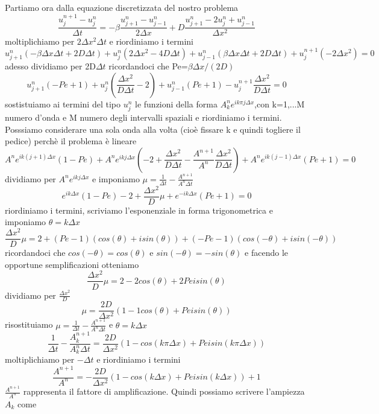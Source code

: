 \documentclass[]{article}
\begin{document}
\subsection{}
Partiamo ora dalla equazione discretizzata del nostro problema
$$\frac{u^{n+1}_j-u^{n}_j}{\Delta t}=-\beta \frac{u^{n}_{j+1}-u^{n}_{j-1}}{2\Delta x}+D\frac{u^{n}_{j+1}-2u^{n}_{j}+u^{n}_{j-1}}{\Delta x^{2}}$$\newline
moltiplichiamo per $2\Delta x^{2}\Delta t$ e riordiniamo i termini
$$u^{n}_{j+1}(-\beta \Delta x\Delta t+2D\Delta t )+u^{n}_{j}(2\Delta x^{2}-4D\Delta t)+u^{n}_{j-1}(\beta\Delta x\Delta t+2D\Delta t )+u^{n+1}_{j}(-2\Delta x^{2})=0$$
adesso dividiamo per 2D$\Delta t$ ricordandoci che Pe=$\beta\Delta x/(2D)$
$$u^{n}_{j+1}(-Pe+1)+u^{n}_{j}(\frac{\Delta x^{2}}{D\Delta t}-2)+u^{n}_{j-1}(Pe+1)-u^{n+1}_{j}\frac{\Delta x^{2}}{D\Delta t}=0$$
sostistuiamo ai termini del tipo $u^{n}_{j}$ le funzioni della forma $A^{n}_k e^{ik\pi j\Delta x}$,con k=1,...M numero d'onda e M numero degli intervalli spaziali e riordiniamo i termini. Posssiamo considerare una sola onda alla volta (cioè fissare k e quindi togliere il pedice) perchè il problema è lineare
$$A^{n} e^{ik (j+1)\Delta x}(1-Pe)+A^{n} e^{ik j\Delta x}(-2+\frac{\Delta x^{2}}{D\Delta t}-\frac{A^{n+1}}{A^{n}}\frac{\Delta x^{2}}{D\Delta t})+A^{n} e^{ik (j-1)\Delta x}(Pe+1)=0$$
dividiamo per $A^{n} e^{ik j\Delta x}$ e imponiamo $\mu =\frac{1}{\Delta t}-\frac{A^{n+1}}{A^{n} \Delta t}$
$$ e^{ik\Delta x}(1-Pe)-2+\frac{\Delta x^{2}}{D}\mu+ e^{-ik \Delta x}(Pe+1)=0$$
riordiniamo i termini, scriviamo l'esponenziale in forma trigonometrica e imponiamo $\theta=k\Delta x$
$$\frac{\Delta x^{2}}{D}\mu=2+(Pe-1)(cos(\theta)+isin(\theta))+(-Pe-1)(cos(-\theta)+isin(-\theta))$$
ricordandoci che $cos(-\theta)=cos(\theta)$ e $sin(-\theta)=-sin(\theta)$ e facendo le opportune semplificazioni otteniamo
$$\frac{\Delta x^{2}}{D}\mu=2-2cos(\theta)+2Pe i sin(\theta)$$
dividiamo per  $\frac{\Delta x^{2}}{D}$
$$\mu=\frac{2D}{\Delta x^{2}}(1-1cos(\theta)+Pe i sin(\theta))$$
risostituiamo $\mu =\frac{1}{\Delta t}-\frac{A^{n+1}}{A^{n} \Delta t}$  e $\theta=k\Delta x$
$$\frac{1}{\Delta t}-\frac{A^{n+1}_k}{A^{n}_k \Delta t}=\frac{2D}{\Delta x^{2}}(1-cos(k\pi\Delta x)+Pe i sin(k\pi\Delta x))$$
moltiplichiamo per $-\Delta t $ e riordiniamo i termini
$$\frac{A^{n+1}}{A^{n}}=-\frac{2D}{\Delta x^{2}}(1-cos(k\Delta x)+Pe i sin(k\Delta x))+1$$
$\frac{A^{n+1}}{A^{n}}$ rappresenta il fattore di amplificazione.\newline
Quindi possiamo scrivere l'ampiezza $A_{k}$ come
\end{document}
